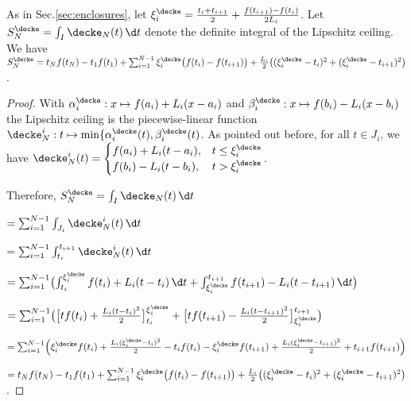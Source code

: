 \begin{thm} \label{thm:quad_floor} As in Sec.\ref{sec:enclosures}, let  $\xi^{\decke}_i =  \frac{t_i+t_{i+1}}{2}+ \frac{f(t_{i+1}) - f(t_i)}{2 L_i}  $. Let $S^\decke_N = \int_I \decke_N (t) \, \d t$ denote the definite integral of the Lipschitz ceiling.
We have 
$S^\decke_N=t_N f(t_N) - t_1 f(t_1)+\sum_{i=1}^{N-1} \xi^\decke_{i} \bigl( f(t_i) - f(t_{i+1}) \bigr) + \frac{L_i}{2} \bigl( (\xi^\decke_{i}-t_i )^2+ (\xi^\decke_{i} -t_{i+1})^2 \bigr) $. 


%

\begin{proof} With 
$\alpha^\decke_i: x \mapsto f(a_i) + L_i (x - a_i)$ and $\beta^\decke_i: x \mapsto
f(b_i) -L_i (x - b_i)$ the Lipschitz ceiling is the piecewise-linear function $\decke^i_N: t \mapsto \min\{ \alpha^\decke_i(t), \beta^\decke_i(t)$. As pointed out before, for all $t \in J_i$, we have $\decke_N^i(t) = 
 \begin{cases}  
 f(a_i) + L_i (t - a_i), & t \leq \xi^\decke_i \\
 f(b_i) -L_i (t - b_i), & t > \xi^\decke_i 
 \end{cases}$.

Therefore,
$S^\decke_N = \int_I \decke_N (t) \, \d t$
 
 $= \sum_{i=1}^{N-1} \int_{J_i} \decke_N^i (t) \, \d t$
 
 $= \sum_{i=1}^{N-1} \int_{t_i}^{t_{i+1}} \decke_N^i (t) \, \d t$
  
  $= \sum_{i=1}^{N-1} \bigl( \int_{t_i}^{\xi^\decke_{i}}  f(t_i) + L_i (t - t_i) \, \d t + \int_{\xi^\decke_{i}}^{t_{i+1}}   f(t_{i+1}) -L_i (t - t_{i+1})\, \d t \bigr)$
  
  $= \sum_{i=1}^{N-1} \bigl( \bigl[t f(t_i) + \frac{L_i (t-t_i )^2}{2}\bigr]_{t_i}^{\xi^\decke_{i}}  + \bigl[t f(t_{i+1}) - \frac{L_i (t -t_{i+1})^2}{2}\bigr]^{t_{i+1}}_{\xi^\decke_{i}} \bigr)$
  
  $= \sum_{i=1}^{N-1} \Bigl( \xi^\decke_{i} f(t_i) + \frac{L_i (\xi^\decke_{i}-t_i )^2}{2} - t_i f(t_i)   
  - \xi^\decke_{i} f(t_{i+1}) + \frac{L_i (\xi^\decke_{i} -t_{i+1})^2}{2}  + t_{i+1} f(t_{i+1}) \Bigr)$
  
    $=  t_N f(t_N) - t_1 f(t_1)+\sum_{i=1}^{N-1} \xi^\decke_{i} \bigl( f(t_i) - f(t_{i+1}) \bigr) + \frac{L_i}{2} \bigl( (\xi^\decke_{i}-t_i )^2+ (\xi^\decke_{i} -t_{i+1})^2 \bigr)      $.
\end{proof}

\end{thm}

